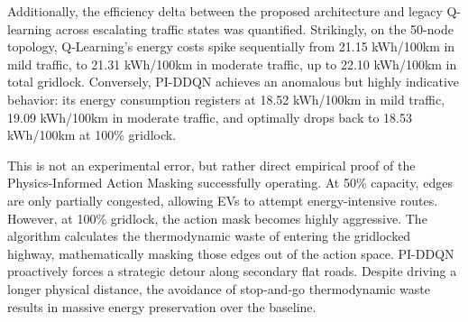 \documentclass[journal, a4paper, twocolumn]{IEEEtran}
\begin{document}
\begin{table}[htbp]
\centering
\caption{Sensitivity Analysis of $\lambda$}
\label{tab:sensitivity_analysis}
\end{table}

Additionally, the efficiency delta between the proposed architecture and legacy Q-learning across escalating traffic states was quantified. Strikingly, on the 50-node topology, Q-Learning's energy costs spike sequentially from 21.15 kWh/100km in mild traffic, to 21.31 kWh/100km in moderate traffic, up to 22.10 kWh/100km in total gridlock. Conversely, PI-DDQN achieves an anomalous but highly indicative behavior: its energy consumption registers at 18.52 kWh/100km in mild traffic, 19.09 kWh/100km in moderate traffic, and optimally drops back to 18.53 kWh/100km at 100\% gridlock.

This is not an experimental error, but rather direct empirical proof of the Physics-Informed Action Masking successfully operating. At 50\% capacity, edges are only partially congested, allowing EVs to attempt energy-intensive routes. However, at 100\% gridlock, the action mask becomes highly aggressive. The algorithm calculates the thermodynamic waste of entering the gridlocked highway, mathematically masking those edges out of the action space. PI-DDQN proactively forces a strategic detour along secondary flat roads. Despite driving a longer physical distance, the avoidance of stop-and-go thermodynamic waste results in massive energy preservation over the baseline.
\end{document}
